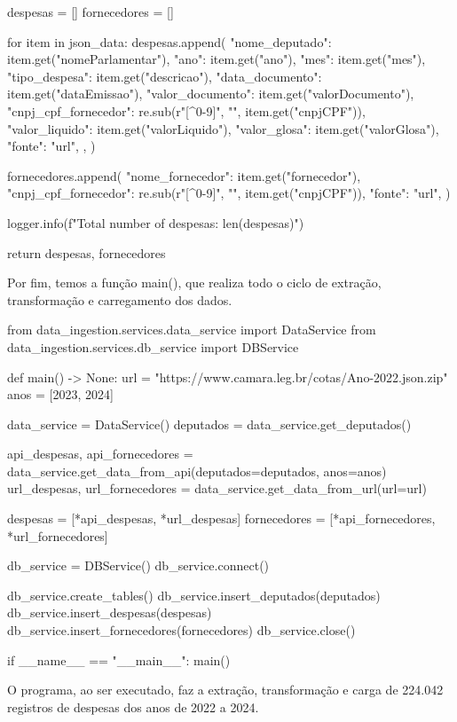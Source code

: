 \documentclass[12pt, a4paper]{article}
\begin{document}
\begin{python}
		despesas = []
		fornecedores = []
		
		for item in json_data:
		despesas.append(
		{
			"nome_deputado": item.get("nomeParlamentar"),
			"ano": item.get("ano"),
			"mes": item.get("mes"),
			"tipo_despesa": item.get("descricao"),
			"data_documento": item.get("dataEmissao"),
			"valor_documento": item.get("valorDocumento"),
			"cnpj_cpf_fornecedor": re.sub(r"[^0-9]", "", item.get("cnpjCPF")),
			"valor_liquido": item.get("valorLiquido"),
			"valor_glosa": item.get("valorGlosa"),
			"fonte": "url",
		},
		)
		
		fornecedores.append({
			"nome_fornecedor": item.get("fornecedor"),
			"cnpj_cpf_fornecedor": re.sub(r"[^0-9]", "", item.get("cnpjCPF")),
			"fonte": "url",
		})
		
		logger.info(f"Total number of despesas: {len(despesas)}")
		
		return despesas, fornecedores

\end{python}


Por fim, temos a função main(), que realiza todo o ciclo de extração, transformação e carregamento dos dados.

\begin{python}
from data_ingestion.services.data_service import DataService
from data_ingestion.services.db_service import DBService


def main() -> None:
	url = "https://www.camara.leg.br/cotas/Ano-2022.json.zip"
	anos = [2023, 2024]
	
	data_service = DataService()
	deputados = data_service.get_deputados()
	
	api_despesas, api_fornecedores = data_service.get_data_from_api(deputados=deputados, anos=anos)
	url_despesas, url_fornecedores = data_service.get_data_from_url(url=url)
	
	despesas = [*api_despesas, *url_despesas]
	fornecedores = [*api_fornecedores, *url_fornecedores]
	
	db_service = DBService()
	db_service.connect()
	
	db_service.create_tables()
	db_service.insert_deputados(deputados)
	db_service.insert_despesas(despesas)
	db_service.insert_fornecedores(fornecedores)
	db_service.close()


if __name__ == "__main__":
	main()
	
\end{python}

O programa, ao ser executado, faz a extração, transformação e carga de 224.042 registros de despesas dos anos de 2022 a 2024.
\end{document}
